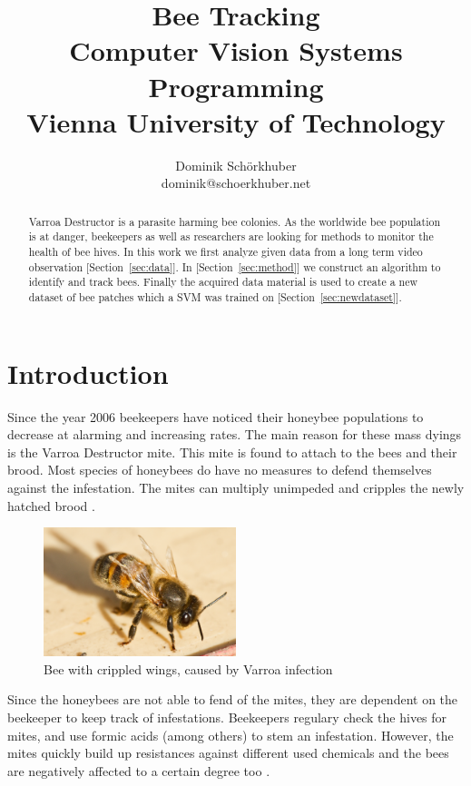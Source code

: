 \documentclass[10pt,a4paper]{article}
\begin{document}
\title{%
  Bee Tracking \\
  \large Computer Vision Systems Programming \\
    Vienna University of Technology}
\author{Dominik Schörkhuber\\dominik@schoerkhuber.net}
\maketitle

\begin{abstract}
Varroa Destructor is a parasite harming bee colonies. As the worldwide bee population is at danger, beekeepers as well as researchers are looking for methods to monitor the health of bee hives. In this work we first analyze given data from a long term video observation [Section~\ref{sec:data}]. In [Section~\ref{sec:method}] we construct an algorithm to identify and track bees. Finally the acquired data material is used to create a new dataset of bee patches which a SVM was trained on [Section~\ref{sec:newdataset}].
\end{abstract}

\section{Introduction}
Since the year 2006 beekeepers have noticed their honeybee populations to decrease at alarming  and increasing rates. The main reason for these mass dyings is the Varroa Destructor mite. This mite is found to attach to the bees and their brood. Most species of honeybees do have no measures to defend themselves against the infestation. The mites can multiply unimpeded and  cripples the newly hatched brood \cite{hagopian}\cite{epstein}.

\begin{figure}
\centering
\includegraphics[width=0.5\textwidth]{crippled}
\caption{Bee with crippled wings, caused by Varroa infection}
\end{figure}

Since the honeybees are not able to fend of the mites, they are dependent on the beekeeper to keep track of infestations. Beekeepers regulary check the hives for mites, and use formic acids (among others) to stem an infestation. However, the mites quickly build up resistances against different used chemicals and the bees are negatively affected to a certain degree too \cite{chiron2013detecting}.
\end{document}
